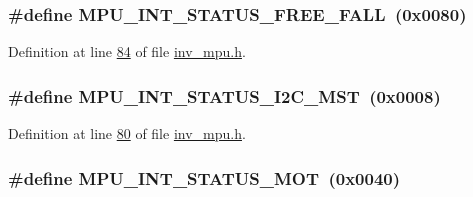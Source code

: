\subsubsection[{\texorpdfstring{M\+P\+U\+\_\+\+I\+N\+T\+\_\+\+S\+T\+A\+T\+U\+S\+\_\+\+F\+R\+E\+E\+\_\+\+F\+A\+LL}{MPU_INT_STATUS_FREE_FALL}}]{\setlength{\rightskip}{0pt plus 5cm}\#define M\+P\+U\+\_\+\+I\+N\+T\+\_\+\+S\+T\+A\+T\+U\+S\+\_\+\+F\+R\+E\+E\+\_\+\+F\+A\+LL~(0x0080)}\hypertarget{group___d_r_i_v_e_r_s_ga000cfa5230cb895c6bad322856465552}{}\label{group___d_r_i_v_e_r_s_ga000cfa5230cb895c6bad322856465552}


Definition at line \hyperlink{inv__mpu_8h_source_l00084}{84} of file \hyperlink{inv__mpu_8h_source}{inv\+\_\+mpu.\+h}.

\subsubsection[{\texorpdfstring{M\+P\+U\+\_\+\+I\+N\+T\+\_\+\+S\+T\+A\+T\+U\+S\+\_\+\+I2\+C\+\_\+\+M\+ST}{MPU_INT_STATUS_I2C_MST}}]{\setlength{\rightskip}{0pt plus 5cm}\#define M\+P\+U\+\_\+\+I\+N\+T\+\_\+\+S\+T\+A\+T\+U\+S\+\_\+\+I2\+C\+\_\+\+M\+ST~(0x0008)}\hypertarget{group___d_r_i_v_e_r_s_ga5755e84f3a2e7d331f7612dbfea18ecc}{}\label{group___d_r_i_v_e_r_s_ga5755e84f3a2e7d331f7612dbfea18ecc}


Definition at line \hyperlink{inv__mpu_8h_source_l00080}{80} of file \hyperlink{inv__mpu_8h_source}{inv\+\_\+mpu.\+h}.

\subsubsection[{\texorpdfstring{M\+P\+U\+\_\+\+I\+N\+T\+\_\+\+S\+T\+A\+T\+U\+S\+\_\+\+M\+OT}{MPU_INT_STATUS_MOT}}]{\setlength{\rightskip}{0pt plus 5cm}\#define M\+P\+U\+\_\+\+I\+N\+T\+\_\+\+S\+T\+A\+T\+U\+S\+\_\+\+M\+OT~(0x0040)}\hypertarget{group___d_r_i_v_e_r_s_gaa1ab51fb5995e568edd425f8486cb2c8}{}\label{group___d_r_i_v_e_r_s_gaa1ab51fb5995e568edd425f8486cb2c8}


